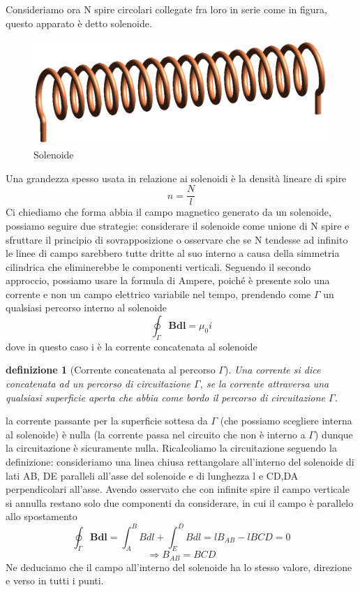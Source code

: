 \documentclass[10pt,a4paper]{article}
\newtheorem{definizione}{definizione}
\begin{document}
Consideriamo ora N spire circolari collegate fra loro in serie come in figura, questo apparato è detto solenoide.
\begin{figure}[h!]
	\centering
	\includegraphics[width=0.6\linewidth]{images/Solenoid}
	\caption{Solenoide}
	\label{fig:solenoide}
\end{figure}
\FloatBarrier
Una grandezza spesso usata in relazione ai solenoidi è la densità lineare di spire 
\[n = \frac{N}{l}\]
Ci chiediamo che forma abbia il campo magnetico generato da un solenoide, possiamo seguire due strategie: considerare il solenoide come unione di N spire e sfruttare il principio di sovrapposizione o osservare che se N tendesse ad infinito le linee di campo sarebbero tutte dritte al suo interno a causa della simmetria cilindrica che eliminerebbe le componenti verticali. Seguendo il secondo approccio, possiamo usare la formula di Ampere, poiché è presente solo una corrente e non un campo elettrico variabile nel tempo, prendendo come $\Gamma$ un qualsiasi percorso interno al solenoide
\[\oint_{\Gamma}\mathbf{B}\mathbf{dl}= \mu_0 i\]
dove in questo caso i è la corrente concatenata al solenoide
\begin{definizione}[Corrente concatenata al percorso \(\Gamma\)]
	Una corrente si dice concatenata ad un percorso di circuitazione \(\Gamma\), se la corrente attraversa una qualsiasi superficie aperta che abbia come bordo il percorso di circuitazione \(\Gamma\). 
\end{definizione}
la corrente passante per la superficie sottesa da $\Gamma$ (che possiamo scegliere interna al solenoide) è nulla (la corrente passa nel circuito che non è interno a $\Gamma$) dunque la circuitazione è sicuramente nulla. 
Ricalcoliamo la circuitazione seguendo la definizione: consideriamo una linea chiusa rettangolare all'interno del solenoide di lati AB, DE paralleli all'asse del solenoide e di lunghezza l e CD,DA perpendicolari all'asse. Avendo osservato che con infinite spire il campo verticale si annulla restano solo due componenti da considerare, in cui il campo è parallelo allo spostamento
\[\oint_{\Gamma}\mathbf{B}\mathbf{dl}= \int_{A}^{B}Bdl+\int_{E}^{D}Bdl=lB_{AB}-lB{CD}=0\]
\[\Rightarrow B_{AB}=B{CD}\]
Ne deduciamo che il campo all'interno del solenoide ha lo stesso valore, direzione e verso in tutti i punti.\\
\end{document}
